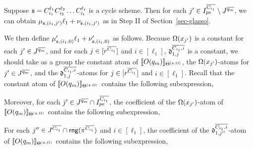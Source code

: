 \begin{appendix}
Suppose ${\mathfrak{s} }=C_{i_1}^{\ell_1} C^{\ell_2}_{i_2} \dots C^{\ell_t}_{i_t}$ is a cycle scheme. Then for each $j' \in  I^{\overline{C_{i_1}}}_{pe} \setminus J^{\overline{q_m}}$, we can obtain $\mu_{{\mathfrak{s} }, (i_1,j')} \ell_1 + \nu_{{\mathfrak{s} }, (i_1,j')}$ as in Step II of Section~\ref{sec-glasso}. 

We then define $\mu'_{{\mathfrak{s} },(i_1,0)} \ell_1 + \nu'_{{\mathfrak{s} },(i_1,0)}$ as follows. Because $\Omega(x_{j'})$ is a constant for each $j' \in J^{\overline{q_m}}$, and for each $j \in [r^{\overline{C_{i_1}}}]$ and $i \in [\ell_1]$, $\mathfrak{d}^{\overline{C_{i_1}, i}}_{1, j}$ is a constant, we should take as a group the constant atom of  $\llbracket O(q_m)\rrbracket_{\Theta^{({\mathfrak{s} },\Omega)}}$, the $\Omega(x_{j'})$-atoms for $j' \in J^{\overline{q_m}}$, and the $\mathfrak{d}^{\overline{C_{i_1}, i}}_{1, j}$-atoms for $j \in [r^{\overline{C_{i_1}}}]$ and $i \in [\ell_1]$.
%
Recall that the constant atom of $\llbracket O(q_m)\rrbracket_{\Theta^{({\mathfrak{s} },\Omega)}}$ contains the following  subexpression,
\begin{center}
	\vspace{-0.2cm}
\end{center}
Moreover, for each $j' \in  J^{\overline{q_m}} \cap I^{\overline{C_{i_1}}}_{pe}$, the coefficient of the $\Omega(x_{j'})$-atom of $\llbracket O(q_m)\rrbracket_{\Theta^{({\mathfrak{s} },\Omega)}}$ contains the following subexpression, 
\begin{center}
\end{center}

For each $j'' \in J^{\overline{C_{i_1}}} \cap \mathsf{rng}(\pi^{\overline{C_{i_1}}})$ and $i \in [\ell_1]$, the coefficient of the $\mathfrak{d}^{\overline{C_{i_1}, i}}_{1, j''}$-atom of $\llbracket O(q_m)\rrbracket_{\Theta^{({\mathfrak{s} },\Omega)}}$ contains the following subexpression, 
\begin{center}
\end{center}


\end{appendix}
